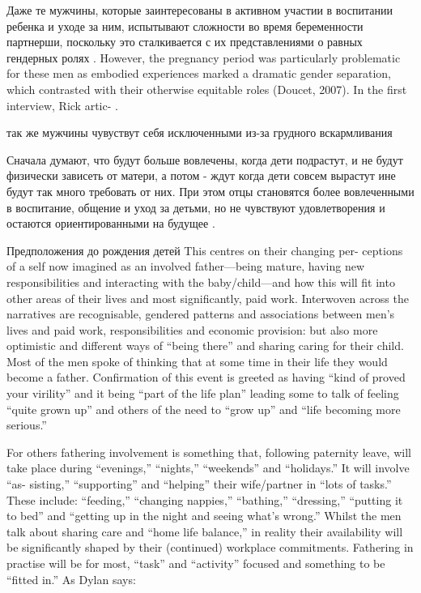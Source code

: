 \documentclass{../../common/thesisbyxetex}
\begin{document}
Даже те мужчины, которые заинтересованы в активном участии в воспитании ребенка и уходе за ним,
испытывают сложности во время беременности партнерши, поскольку это сталкивается с их
представлениями о равных гендерных ролях . However, the pregnancy period was
particularly problematic for these
men as embodied experiences marked a dramatic gender separation, which contrasted
with their otherwise equitable roles (Doucet, 2007). In the first interview, Rick artic-
\cite[20]{long}.

так же мужчины чувуствут себя исключенными из-за грудного вскармливания \cite[21]{long}

Сначала думают, что будут больше вовлечены, когда дети подрастут, и не будут физически зависеть от
матери, а потом - ждут когда дети совсем вырастут ине будут так много требовать от них. При этом
отцы становятся более вовлеченными в воспитание, общение и уход за детьми, но не чувствуют
удовлетворения и остаются ориентированными на будущее \cite[22]{long}.


Предположения до рождения детей
This centres on their changing per-
ceptions of a self now imagined as an involved father—being mature, having new
responsibilities and interacting with the baby/child—and how this will fit into other
areas of their lives and most significantly, paid work. Interwoven across the narratives
are recognisable, gendered patterns and associations between men’s lives and paid
work, responsibilities and economic provision: but also more optimistic and different
ways of “being there” and sharing caring for their child. Most of the men spoke of
thinking that at some time in their life they would become a father. Confirmation of this
event is greeted as having “kind of proved your virility” and it being “part of the life
plan” leading some to talk of feeling “quite grown up” and others of the need to “grow
up” and “life becoming more serious.”\cite[367]{tri}

For others fathering involvement is something that, following paternity leave, will
take place during “evenings,” “nights,” “weekends” and “holidays.” It will involve “as-
sisting,” “supporting” and “helping” their wife/partner in “lots of tasks.” These include:
“feeding,” “changing nappies,” “bathing,” “dressing,” “putting it to bed” and “getting
up in the night and seeing what’s wrong.” Whilst the men talk about sharing care and
“home life balance,” in reality their availability will be significantly shaped by their
(continued) workplace commitments. Fathering in practise will be for most, “task” and
“activity” focused and something to be “fitted in.” \cite[369]{tri}As Dylan says:
\end{document}
